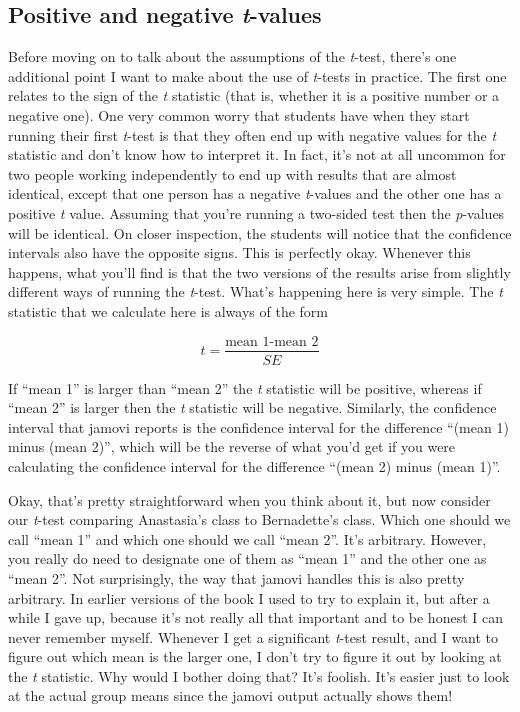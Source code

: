 \documentclass[
  a4paper,
]{book}
\begin{document}
\hypertarget{positive-and-negative-t-values}{%
\subsection{\texorpdfstring{Positive and negative
\emph{t}-values}{Positive and negative t-values}}\label{positive-and-negative-t-values}}

Before moving on to talk about the assumptions of the \emph{t}-test,
there's one additional point I want to make about the use of
\emph{t}-tests in practice. The first one relates to the sign of the
\emph{t} statistic (that is, whether it is a positive number or a
negative one). One very common worry that students have when they start
running their first \emph{t}-test is that they often end up with
negative values for the \emph{t} statistic and don't know how to
interpret it. In fact, it's not at all uncommon for two people working
independently to end up with results that are almost identical, except
that one person has a negative \emph{t}-values and the other one has a
positive \emph{t} value. Assuming that you're running a two-sided test
then the \emph{p}-values will be identical. On closer inspection, the
students will notice that the confidence intervals also have the
opposite signs. This is perfectly okay. Whenever this happens, what
you'll find is that the two versions of the results arise from slightly
different ways of running the \emph{t}-test. What's happening here is
very simple. The \emph{t} statistic that we calculate here is always of
the form

\[t=\frac{\text{mean 1-mean 2}}{SE}\]

If ``mean 1'' is larger than ``mean 2'' the \emph{t} statistic will be
positive, whereas if ``mean 2'' is larger then the \emph{t} statistic
will be negative. Similarly, the confidence interval that jamovi reports
is the confidence interval for the difference ``(mean 1) minus (mean
2)'', which will be the reverse of what you'd get if you were
calculating the confidence interval for the difference ``(mean 2) minus
(mean 1)''.

Okay, that's pretty straightforward when you think about it, but now
consider our \emph{t}-test comparing Anastasia's class to Bernadette's
class. Which one should we call ``mean 1'' and which one should we call
``mean 2''. It's arbitrary. However, you really do need to designate one
of them as ``mean 1'' and the other one as ``mean 2''. Not surprisingly,
the way that jamovi handles this is also pretty arbitrary. In earlier
versions of the book I used to try to explain it, but after a while I
gave up, because it's not really all that important and to be honest I
can never remember myself. Whenever I get a significant \emph{t}-test
result, and I want to figure out which mean is the larger one, I don't
try to figure it out by looking at the \emph{t} statistic. Why would I
bother doing that? It's foolish. It's easier just to look at the actual
group means since the jamovi output actually shows them!
\end{document}
